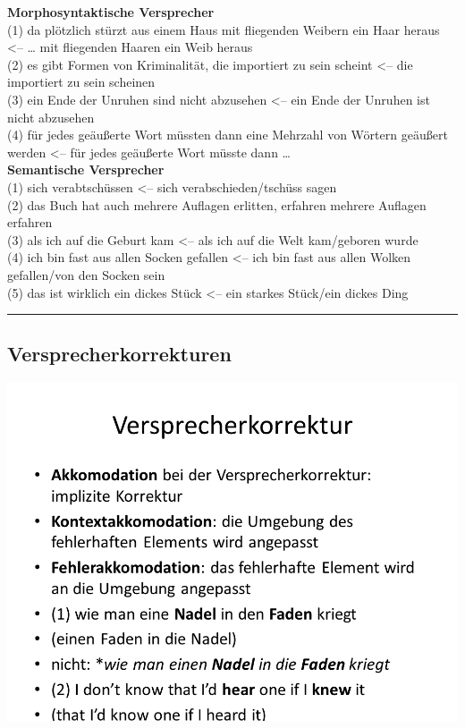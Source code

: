 \documentclass[
  letterpaper,
]{scrbook}
\begin{document}
\textbf{Morphosyntaktische Versprecher}\\
(1) da plötzlich stürzt aus einem Haus mit fliegenden Weibern ein Haar
heraus \textless-- \ldots{} mit fliegenden Haaren ein Weib heraus\\
(2) es gibt Formen von Kriminalität, die importiert zu sein scheint
\textless-- die importiert zu sein scheinen\\
(3) ein Ende der Unruhen sind nicht abzusehen \textless-- ein Ende der
Unruhen ist nicht abzusehen\\
(4) für jedes geäußerte Wort müssten dann eine Mehrzahl von Wörtern
geäußert werden \textless-- für jedes geäußerte Wort müsste dann
\ldots{}\\

\textbf{Semantische Versprecher}\\
(1) sich verabtschüssen \textless-- sich verabschieden/tschüss sagen\\
(2) das Buch hat auch mehrere Auflagen erlitten, erfahren mehrere
Auflagen erfahren\\
(3) als ich auf die Geburt kam \textless-- als ich auf die Welt
kam/geboren wurde\\
(4) ich bin fast aus allen Socken gefallen \textless-- ich bin fast aus
allen Wolken gefallen/von den Socken sein\\
(5) das ist wirklich ein dickes Stück \textless-- ein starkes Stück/ein
dickes Ding\\

\begin{center}\rule{0.5\linewidth}{0.5pt}\end{center}

\hypertarget{versprecherkorrekturen}{%
\subsection{Versprecherkorrekturen}\label{versprecherkorrekturen}}

\includegraphics[width=1\textwidth,height=\textheight]{./pictures/Versprechertypen_10.PNG}
\end{document}
